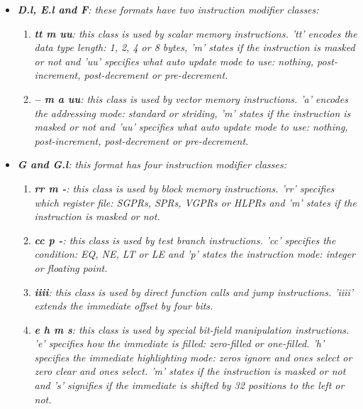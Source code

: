\begin{itemize}
\begin{enumerate}
                    \end{enumerate}

                \item \textit{\textbf{D.l, E.l and F}: these formats have two instruction modifier classes:}

                    \begin{enumerate}

                        \item \textit{\textbf{tt m uu}: this class is used by scalar memory instructions. 'tt' encodes the data type length: 1, 2, 4 or 8 bytes, 'm' states if the instruction is masked or not and 'uu' specifies what auto update mode to use: nothing, post-increment, post-decrement or pre-decrement.}

                        \item \textit{\textbf{-- m a uu}: this class is used by vector memory instructions. 'a' encodes the addressing mode: standard or striding, 'm' states if the instruction is masked or not and 'uu' specifies what auto update mode to use: nothing, post-increment, post-decrement or pre-decrement.}

                    \end{enumerate}

                \item \textit{\textbf{G and G.l}: this format has four instruction modifier classes:}

                    \begin{enumerate}

                        \item \textit{\textbf{rr m -}: this class is used by block memory instructions. 'rr' specifies which register file: SGPRs, SPRs, VGPRs or HLPRs and 'm' states if the instruction is masked or not.}

                        \item \textit{\textbf{cc p -}: this class is used by test branch instructions. 'cc' specifies the condition: EQ, NE, LT or LE and 'p' states the instruction mode: integer or floating point.}

                        \item \textit{\textbf{iiii}: this class is used by direct function calls and jump instructions. 'iiii' extends the immediate offset by four bits.}

                        \item \textit{\textbf{e h m s}: this class is used by special bit-field manipulation instructions. 'e' specifies how the immediate is filled: zero-filled or one-filled. 'h' specifies the immediate highlighting mode: zeros ignore and ones select or zero clear and ones select. 'm' states if the instruction is masked or not and 's' signifies if the immediate is shifted by 32 positions to the left or not.}


\end{enumerate}
\end{itemize}
